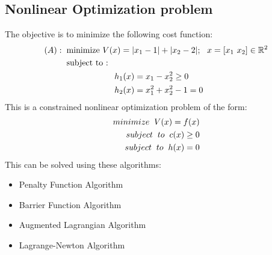 \subsection{Nonlinear Optimization problem}
The objective is to minimize the following cost function:
\begin{align}
(A) : \hspace{2mm}
& \mbox{minimize} \ V(x) = | x_1 -1 | + | x_2 - 2 | ; \ \  x =[x_1 \ x_2] \in \mathbb{R}^2 \nonumber \\
& \mbox{subject to : } \nonumber \\
& \hspace{2cm} h_1(x)= x_1 - x_2^2  \geq 0 \nonumber \\
& \hspace{2cm} h_2(x)= x_1^2 + x_2^2 -1  = 0 \nonumber
\end{align}
This is a constrained nonlinear optimization problem of the form:
\begin{align}
    minimize \hspace{2mm} V(x) = f(x) \\
    subject\hspace{2mm} to\hspace{2mm} c(x) \geq 0 \\
    subject\hspace{2mm} to \hspace{2mm}h(x) = 0 \\
\end{align}
This can be solved using these algorithms: 
\begin{itemize}
    \item Penalty Function Algorithm
    \item Barrier Function Algorithm
    \item Augmented Lagrangian Algorithm
    \item Lagrange-Newton Algorithm
\end{itemize}
